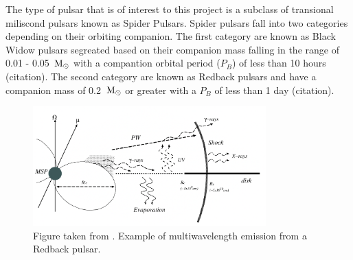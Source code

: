 The type of pulsar that is of interest to this project is a subclass of transional miliscond pulsars known as Spider Pulsars. Spider pulsars fall into two categories depending on their orbiting companion. The first category are known as Black Widow pulsars segreated based on their companion mass falling in the range of 0.01 - 0.05 $\, \text{M}_\odot$ with a compantion orbital period ($P_B$) of less than 10 hours (citation). The second category are known as Redback pulsars and have a companion mass of 0.2 $\, \text{M}_\odot$ or greater with a $P_B$ of less than 1 day (citation). \\ 

\begin{figure}
    \centering
    \includegraphics[width=0.8\textwidth]{figs/theory/redback-multiwavelength-emission.jpg}
    \caption{Figure taken from \cite{takata_multi-wavelength_2014}. Example of multiwavelength emission from a Redback pulsar.}
\end{figure}

